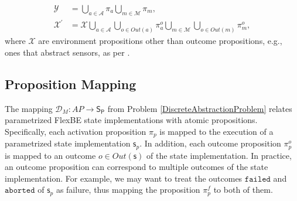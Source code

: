 \begin{subequations}
	\label{ActOutAP}
	\begin{align}
		\mathcal{Y} &= \bigcup \limits_{a \in \mathcal{A}} \pi_a \bigcup \limits_{m \in \mathcal{M}} \pi_m,\\
		\mathcal{X}^\prime &= \mathcal{X} \bigcup \limits_{a \in \mathcal{A}} \bigcup \limits_{o \in Out(a)} \pi_a^o \bigcup \limits_{m \in \mathcal{M}} \bigcup \limits_{o \in Out(m)} \pi_m^o,
	\end{align}
\end{subequations}
where $\mathcal{X}$ are environment propositions other than outcome propositions, e.g., ones that abstract sensors, as per \cite{KGFP_TRO09}.

\subsection{Proposition Mapping}

The mapping $\mathcal{D}_M : AP \rightarrow \mathsf{S_P}$ from Problem \ref{DiscreteAbstractionProblem} relates parametrized FlexBE state implementations with atomic propositions.
Specifically, each activation proposition $\pi_p$ is mapped to the execution of a parametrized state implementation $\mathsf{s}_p$.
In addition, each outcome proposition $\pi_p^o$ is mapped to an outcome $o \in Out(\mathsf{s})$ of the state implementation.
In practice, an outcome proposition can correspond to multiple outcomes of the state implementation.
For example, we may want to treat the outcomes $\mathtt{failed}$ and $\mathtt{aborted}$ of $\mathsf{s}_p$ as failure, thus mapping the proposition $\pi_p^f$ to both of them.



